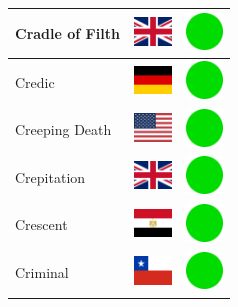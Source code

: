 \documentclass[12pt, a4paper, twoside]{report}
\begin{document}
\begin{center}
\begin{longtable}{|p{5cm}|p{2cm}|p{2cm}|}
Cradle of Filth & \includegraphics[width=1cm]{4x3/gb} & \includegraphics[width=1cm]{likes/y} \\ \hline
Credic & \includegraphics[width=1cm]{4x3/de} & \includegraphics[width=1cm]{likes/y} \\ \hline
Creeping Death & \includegraphics[width=1cm]{4x3/us} & \includegraphics[width=1cm]{likes/y} \\ \hline
Crepitation & \includegraphics[width=1cm]{4x3/gb} & \includegraphics[width=1cm]{likes/y} \\ \hline
Crescent & \includegraphics[width=1cm]{4x3/eg} & \includegraphics[width=1cm]{likes/y} \\ \hline
Criminal & \includegraphics[width=1cm]{4x3/cl} & \includegraphics[width=1cm]{likes/y} \\ \hline

\end{longtable}
\end{center}
\end{document}
